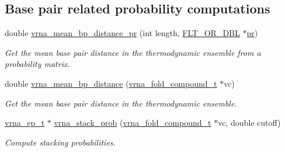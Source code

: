 \subsection*{Base pair related probability computations}
\begin{DoxyCompactItemize}
\item 
double \hyperlink{group__part__func__global_gad3f0c240512e6d43e2e4d4c2076021f5}{vrna\+\_\+mean\+\_\+bp\+\_\+distance\+\_\+pr} (int length, \hyperlink{group__data__structures_ga31125aeace516926bf7f251f759b6126}{F\+L\+T\+\_\+\+O\+R\+\_\+\+D\+BL} $\ast$\hyperlink{fold__vars_8h_ac98ec419070aee6831b44e5c700f090f}{pr})
\begin{DoxyCompactList}\small\item\em Get the mean base pair distance in the thermodynamic ensemble from a probability matrix. \end{DoxyCompactList}\item 
double \hyperlink{group__part__func__global_gaa6b8983b559b9ef4b2e1b31113ea317b}{vrna\+\_\+mean\+\_\+bp\+\_\+distance} (\hyperlink{group__fold__compound_ga1b0cef17fd40466cef5968eaeeff6166}{vrna\+\_\+fold\+\_\+compound\+\_\+t} $\ast$vc)
\begin{DoxyCompactList}\small\item\em Get the mean base pair distance in the thermodynamic ensemble. \end{DoxyCompactList}\item 
\hyperlink{group__struct__utils__plist_gab9ac98ab55ded9fb90043b024b915aca}{vrna\+\_\+ep\+\_\+t} $\ast$ \hyperlink{group__part__func__global_ga132664bf29fdc30bb5ea715491d1ab22}{vrna\+\_\+stack\+\_\+prob} (\hyperlink{group__fold__compound_ga1b0cef17fd40466cef5968eaeeff6166}{vrna\+\_\+fold\+\_\+compound\+\_\+t} $\ast$vc, double cutoff)
\begin{DoxyCompactList}\small\item\em Compute stacking probabilities. \end{DoxyCompactList}\end{DoxyCompactItemize}
